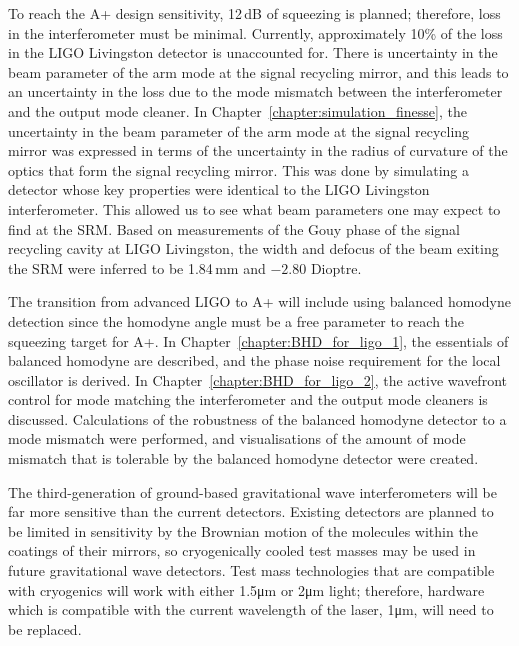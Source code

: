 \par
To reach the A+ design sensitivity, 12\,dB of squeezing is planned; therefore, loss in the interferometer must be minimal. Currently, approximately 10\% of the loss in the LIGO Livingston detector is unaccounted for. There is uncertainty in the beam parameter of the arm mode at the signal recycling mirror, and this leads to an uncertainty in the loss due to the mode mismatch between the interferometer and the output mode cleaner. In Chapter~\ref{chapter:simulation_finesse}, the uncertainty in the beam parameter of the arm mode at the signal recycling mirror was expressed in terms of the uncertainty in the radius of curvature of the optics that form the signal recycling mirror. This was done by simulating a detector whose key properties were identical to the LIGO Livingston interferometer. This allowed us to see what beam parameters one may expect to find at the SRM. Based on measurements of the Gouy phase of the signal recycling cavity at LIGO Livingston, the width and defocus of the beam exiting the SRM were inferred to be 1.84\,mm and $-2.80$ Dioptre.
\par
The transition from advanced LIGO to A+ will include using balanced homodyne detection since the homodyne angle must be a free parameter to reach the squeezing target for A+. In Chapter~\ref{chapter:BHD_for_ligo_1}, the essentials of balanced homodyne are described, and the phase noise requirement for the local oscillator is derived. In Chapter~\ref{chapter:BHD_for_ligo_2}, the active wavefront control for mode matching the interferometer and the output mode cleaners is discussed. Calculations of the robustness of the balanced homodyne detector to a mode mismatch were performed, and visualisations of the amount of mode mismatch that is tolerable by the balanced homodyne detector were created. 
\par 
The third-generation of ground-based gravitational wave interferometers will be far more sensitive than the current detectors. Existing detectors are planned to be limited in sensitivity by the Brownian motion of the molecules within the coatings of their mirrors, so cryogenically cooled test masses may be used in future gravitational wave detectors. Test mass technologies that are compatible with cryogenics will work with either 1.5\si{\micro\metre} or 2\si{\micro\metre} light; therefore, hardware which is compatible with the current wavelength of the laser, 1\si{\micro\metre}, will need to be replaced.
\par
